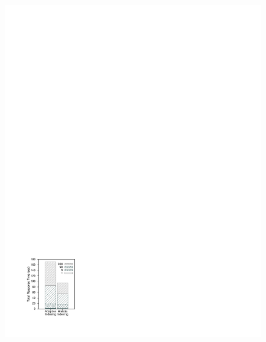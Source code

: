 \begin{figure}[!t]
\begin{center}
{	\includegraphics[trim=2.3cm 2.1cm 15cm 21.7cm]{Figures/holistic/hist_motivation}
	}%
\end{center}
\end{figure}
